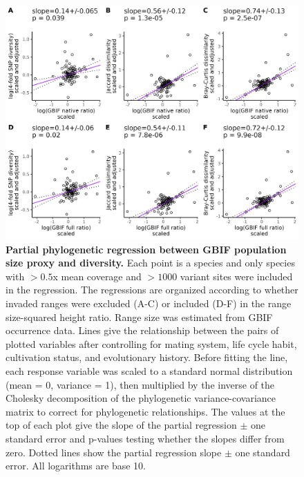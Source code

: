 \documentclass[12pt]{article}
\begin{document}
\begin{figure}[H]
    \centering
    \includegraphics[width=\textwidth]{figures/appendix_d/gbif_popsize_vs_diversity_corrected_2024-12-12.jpg}
    \caption{\textbf{Partial phylogenetic regression between GBIF population size proxy and diversity.} Each point is a species and only species with $>0.5$x mean coverage and $>1000$ variant sites were included in the regression. The regressions are organized according to whether invaded ranges were excluded (A-C) or included (D-F) in the range size-squared height ratio. Range size was estimated from GBIF occurrence data. Lines give the relationship between the pairs of plotted variables after controlling for mating system, life cycle habit, cultivation status, and evolutionary history. Before fitting the line, each response variable was scaled to a standard normal distribution (mean = 0, variance = 1), then multiplied by the inverse of the Cholesky decomposition of the phylogenetic variance-covariance matrix to correct for phylogenetic relationships. The values at the top of each plot give the slope of the partial regression $\pm$ one standard error and p-values testing whether the slopes differ from zero. Dotted lines show the partial regression slope $\pm$ one standard error. All logarithms are base 10.}
\end{figure}
\end{document}
